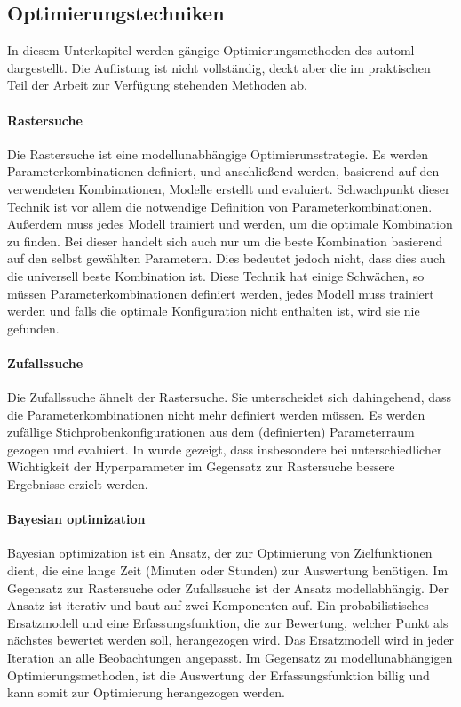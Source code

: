 	\subsection{Optimierungstechniken}
	\label{subsec:Optimierungstechniken}
	In diesem Unterkapitel werden gängige Optimierungsmethoden des \ac{automl} dargestellt. Die Auflistung ist nicht vollständig, deckt aber die im praktischen Teil der Arbeit zur Verfügung stehenden Methoden ab.  
	
	\paragraph{Rastersuche}
	Die Rastersuche \cite{Michelucci.2018} ist eine modellunabhängige Optimierunsstrategie. Es werden Parameterkombinationen definiert, und anschließend werden, basierend auf den verwendeten Kombinationen, Modelle erstellt und evaluiert. Schwachpunkt dieser Technik ist vor allem die notwendige Definition von Parameterkombinationen. Außerdem muss jedes Modell trainiert und werden, um die optimale Kombination zu finden. 
	Bei dieser handelt sich auch nur um die beste Kombination basierend auf den selbst gewählten Parametern. Dies bedeutet jedoch nicht, dass dies auch die universell beste Kombination ist.	
	 Diese Technik hat einige Schwächen, so müssen Parameterkombinationen definiert werden, jedes Modell muss trainiert werden und falls die optimale Konfiguration nicht enthalten ist, wird sie nie gefunden. 
	 
	\paragraph{Zufallssuche}
	Die Zufallssuche ähnelt der Rastersuche. Sie unterscheidet sich dahingehend, dass die Parameterkombinationen nicht mehr definiert werden müssen. Es werden zufällige Stichprobenkonfigurationen aus dem (definierten) Parameterraum gezogen und evaluiert. In \cite{BergstraJamesandYoshuaBengio..2012} wurde gezeigt, dass insbesondere bei unterschiedlicher Wichtigkeit der Hyperparameter im Gegensatz zur Rastersuche bessere Ergebnisse erzielt werden. 

	\paragraph{Bayesian optimization}
	Bayesian optimization ist ein Ansatz, der zur Optimierung von Zielfunktionen dient, die eine lange Zeit (Minuten oder Stunden) zur Auswertung benötigen. Im Gegensatz zur Rastersuche oder Zufallssuche ist der Ansatz modellabhängig. Der Ansatz ist iterativ und baut auf zwei Komponenten auf. Ein probabilistisches Ersatzmodell und eine Erfassungsfunktion, die zur Bewertung, welcher Punkt als nächstes bewertet werden soll, herangezogen wird. Das Ersatzmodell wird in jeder Iteration an alle Beobachtungen angepasst. Im Gegensatz zu modellunabhängigen Optimierungsmethoden, ist die Auswertung der Erfassungsfunktion billig und kann somit zur Optimierung herangezogen werden.
	\cite{Frazier.201807}
	
